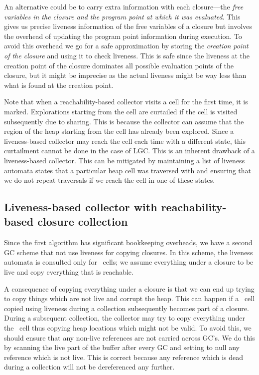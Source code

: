 \documentclass[9pt]{sigplanconf}
\begin{document}
An  alternative  could  be   to  carry  extra  information  with  each
closure---the {\em free variables in the closure and the program point
  at  which  it  was  evaluated}.   This  gives  us  precise  liveness
information  of the  free  variables  of a  closure  but involves  the
overhead of  updating the program point  information during execution.
To avoid this  overhead we go for a safe  approximation by storing the
{\em creation  point of the closure}  and using it  to check liveness.
This is safe  since the liveness at the creation  point of the closure
dominates all possible evaluation points  of the closure, but it might
be imprecise  as the actual  liveness might be  way less than  what is
found at the creation point.

Note that  when a reachability-based  collector visits a cell  for the
first time,  it is  marked.  Explorations starting  from the  cell are
curtailed if the cell is  visited subsequently due to sharing. This is
because the collector can assume  that the region of the heap starting
from  the  cell has  already  been  explored.  Since a  liveness-based
collector may  reach the cell each  time with a  different state, this
curtailment cannot  be done in  the case of  LGC. This is  an inherent
drawback  of a  liveness-based collector.   This can  be  mitigated by
maintaining a list of liveness  automata states that a particular heap
cell was traversed with and  ensuring that we do not repeat traversals
if we reach the cell in one of these states.

\subsection{Liveness-based collector with reachability-based closure
  collection}  Since the first  algorithm has  significant bookkeeping
overheads,  we have  a  second GC  scheme  that not  use liveness  for
copying closures.  In this  scheme, the liveness automata is consulted
only for \CONS\ cells; we assume everything under a closure to be live
and copy everything  that is reachable. 
 
A consequence of copying everything under a closure is that we can end
up trying to copy things which are not live and corrupt the heap. This
can happen if a \CONS\  cell copied using liveness during a collection
subsequently  becomes   part  of  a  closure.    During  a  subsequent
collection,  the  collector  may  try  to copy  everything  under  the
\CONS\ cell thus copying heap  locations which might not be valid.  To
avoid  this, we  should ensure  that any  non-live references  are not
carried across  GC's.  We  do this  by scanning the  live part  of the
buffer after every  GC and setting to null any  reference which is not
live. This  is correct  because any reference  which is dead  during a
collection will not be dereferenced any further.
\end{document}
